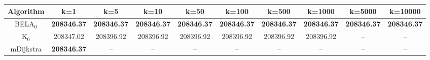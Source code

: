 \begin{tabular}{c|ccccccccc}\toprule
Algorithm & k=1 & k=5 & k=10 & k=50 & k=100 & k=500 & k=1000 & k=5000 & k=10000 \\ \midrule
BELA$_0$ & \textbf{208346.37} & \textbf{208346.37} & \textbf{208346.37} & \textbf{208346.37} & \textbf{208346.37} & \textbf{208346.37} & \textbf{208346.37} & \textbf{208346.37} & \textbf{208346.37} \\
K$_0$ & 208347.02 & 208396.92 & 208396.92 & 208396.92 & 208396.92 & 208396.92 & 208396.92 & -- & -- \\
mDijkstra & \textbf{208346.37} & -- & -- & -- & -- & -- & -- & -- & -- \\ \bottomrule 
\end{tabular}
